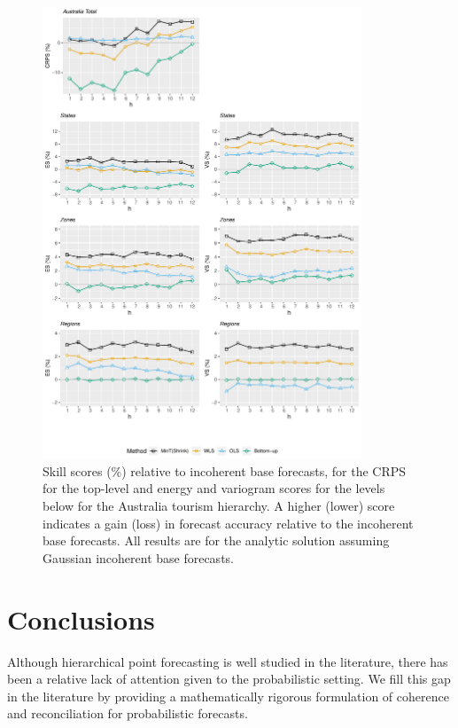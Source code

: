 \documentclass[12pt]{article}
\theoremstyle{definition}
\begin{document}
\begin{figure}
	\centering
	\small
	\includegraphics[width= 0.85\textwidth, height= 0.85\textheight]{Empirical-results/Results-ARIMA/SkillScore_Gauss_Levels.pdf}
	\caption{Skill scores (\%) relative to incoherent base forecasts, for the CRPS for the top-level and energy and variogram scores for the levels below for the Australia tourism hierarchy. A higher (lower) score indicates a gain (loss) in forecast accuracy relative to the incoherent base forecasts. All results are for the analytic solution assuming Gaussian incoherent base forecasts.} \label{fig:ES-SS-Levels}
\end{figure}


\section{Conclusions}\label{sec:conclusion}

Although hierarchical point forecasting is well studied in the literature, there has been a relative lack of attention given to the probabilistic setting. We fill this gap in the literature by providing a mathematically rigorous formulation of coherence and reconciliation for probabilistic forecasts.
\end{document}
